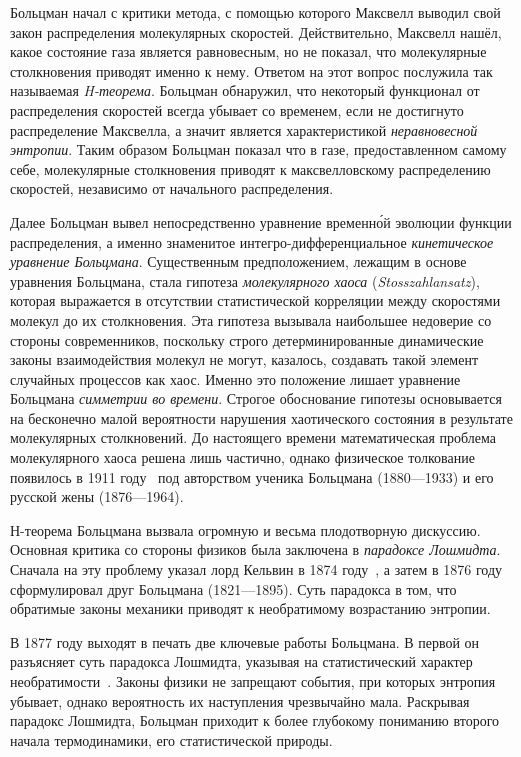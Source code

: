 \documentclass[a4paper, 12pt, oneside]{article} %
\begin{document}
Больцман начал с критики метода, с помощью которого Максвелл выводил
свой закон распределения молекулярных скоростей. Действительно, Максвелл
нашёл, какое состояние газа является равновесным, но не показал, что
молекулярные столкновения приводят именно к нему. Ответом на этот вопрос
послужила так называемая \emph{H-теорема}. Больцман обнаружил, что
некоторый функционал от распределения скоростей всегда убывает со
временем, если не достигнуто распределение Максвелла, а значит является
характеристикой \emph{неравновесной энтропии}. Таким образом
Больцман показал что в газе, предоставленном самому себе, молекулярные
столкновения приводят к максвелловскому распределению скоростей,
независимо от начального распределения.

Далее Больцман вывел непосредственно уравнение временн\'{о}й эволюции
функции распределения, а именно знаменитое интегро-дифференциальное
\emph{кинетическое} \emph{уравнение Больцмана}. Существенным
предположением, лежащим в основе уравнения Больцмана, стала гипотеза
\emph{молекулярного хаоса}
(\foreignlanguage{german}{\emph{Stosszahlansatz}}), которая выражается в
отсутствии статистической корреляции между скоростями молекул до их
столкновения. Эта гипотеза вызывала наибольшее недоверие со стороны
современников, поскольку строго детерминированные динамические законы
взаимодействия молекул не могут, казалось, создавать такой элемент
случайных процессов как хаос. Именно это положение лишает уравнение
Больцмана \emph{симметрии во времени}. Строгое обоснование гипотезы
основывается на бесконечно малой вероятности нарушения хаотического
состояния в результате молекулярных столкновений. До настоящего времени
математическая проблема молекулярного хаоса решена лишь частично, однако
физическое толкование появилось в 1911 году~\cite{ehrenfest1911chaos}
под авторством ученика Больцмана  (1880---1933)
и его русской жены (1876---1964).

Н-теорема Больцмана вызвала огромную и весьма плодотворную дискуссию.
Основная критика со стороны физиков была заключена в \emph{парадоксе
Лошмидта}. Сначала на эту проблему указал лорд Кельвин в 1874
году~\cite{thomson1874kinetic}, а затем в 1876
году~\cite{loschmidt1877paradox} сформулировал друг Больцмана
 (1821---1895). Суть парадокса в том, что
обратимые законы механики приводят к необратимому возрастанию энтропии.

В 1877 году выходят в печать две ключевые работы Больцмана. В
первой он разъясняет суть парадокса Лошмидта, указывая на статистический
характер необратимости~\cite{boltzmann1877loschmidt}. Законы физики не
запрещают события, при которых энтропия убывает, однако вероятность их
наступления чрезвычайно мала. Раскрывая парадокс Лошмидта, Больцман
приходит к более глубокому пониманию второго начала термодинамики, его
статистической природы.
\end{document}
